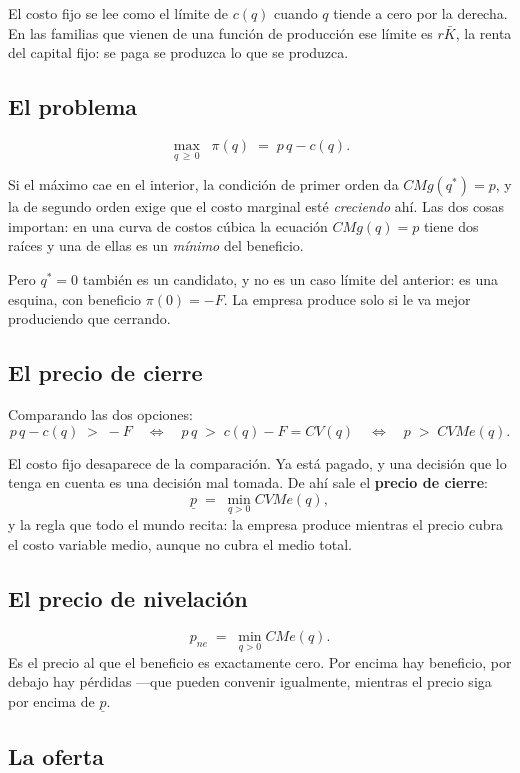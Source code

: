 \documentclass[11pt,a4paper]{appletmanual}
\begin{document}
El costo fijo se lee como el límite de $c(q)$ cuando $q$ tiende a cero por la
derecha. En las familias que vienen de una función de producción ese límite es
$r\bar K$, la renta del capital fijo: se paga se produzca lo que se produzca.

\subsection{El problema}

\[
  \max_{q \,\ge\, 0} \;\; \pi(q) \;=\; p\,q - c(q).
\]

Si el máximo cae en el interior, la condición de primer orden da
$CMg(q^\ast) = p$, y la de segundo orden exige que el costo marginal esté
\emph{creciendo} ahí. Las dos cosas importan: en una curva de costos cúbica la
ecuación $CMg(q) = p$ tiene dos raíces y una de ellas es un \emph{mínimo} del
beneficio.

Pero $q^\ast = 0$ también es un candidato, y no es un caso límite del anterior:
es una esquina, con beneficio $\pi(0) = -F$. La empresa produce solo si le va
mejor produciendo que cerrando.

\subsection{El precio de cierre}

Comparando las dos opciones:
\[
  p\,q - c(q) \;>\; -F
  \quad\Longleftrightarrow\quad
  p\,q \;>\; c(q) - F = CV(q)
  \quad\Longleftrightarrow\quad
  p \;>\; CVMe(q).
\]

El costo fijo desaparece de la comparación. Ya está pagado, y una decisión que
lo tenga en cuenta es una decisión mal tomada. De ahí sale el
\textbf{precio de cierre}:
\[
  \underline{p} \;=\; \min_{q > 0} CVMe(q),
\]
y la regla que todo el mundo recita: la empresa produce mientras el precio
cubra el costo variable medio, aunque no cubra el medio total.

\subsection{El precio de nivelación}

\[
  p_{ne} \;=\; \min_{q>0} CMe(q).
\]
Es el precio al que el beneficio es exactamente cero. Por encima hay beneficio,
por debajo hay pérdidas —que pueden convenir igualmente, mientras el precio
siga por encima de $\underline{p}$.

\subsection{La oferta}
\end{document}
